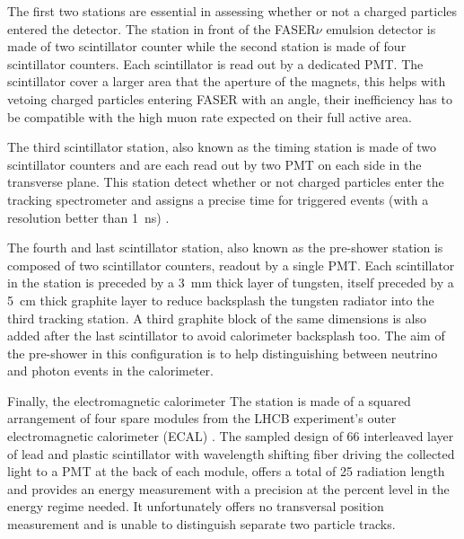 			 The first two stations are essential in assessing whether or not a charged particles entered the detector. The station in front of the FASER$\nu$ emulsion detector is made of two scintillator counter while the second station is made of four scintillator counters. Each scintillator is read out by a dedicated PMT. The scintillator cover a larger area that the aperture of the magnets, this helps with vetoing charged particles entering FASER with an angle, their inefficiency has to be compatible with the high muon rate expected on their full active area. 
			 
			 The third scintillator station, also known as the timing station is made of two scintillator counters and are each read out by two PMT on each side in the transverse plane. This station detect whether or not charged particles enter the tracking spectrometer and assigns a precise time for triggered events (with a resolution better than \SI{1}{\nano\second}) \cite{FASER_Detector}.
			 
			 The fourth and last scintillator station, also known as the pre-shower station is composed of two scintillator counters, readout by a single PMT. Each scintillator in the station is preceded by a \SI{3}{\milli\meter} thick layer of tungsten, itself preceded by a \SI{5}{\centi\meter} thick graphite layer to reduce backsplash the tungsten radiator into the third tracking station. A third graphite block of the same dimensions is also added after the last scintillator to avoid calorimeter backsplash too. The aim of the pre-shower in this configuration is to help distinguishing between neutrino and photon events in the calorimeter. 
			 
			 Finally, the electromagnetic calorimeter  The station is made of a squared arrangement of four spare modules from the LHCB experiment's outer electromagnetic calorimeter (ECAL) \cite{FASER_Detector}. The sampled design of 66 interleaved layer of lead and plastic scintillator with wavelength shifting fiber driving the collected light to a PMT at the back of each module, offers a total of 25 radiation length and provides an energy measurement with a precision at the percent level in the energy regime needed. It unfortunately offers no transversal position measurement and is unable to distinguish separate two particle tracks. 
			 

